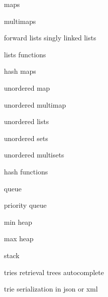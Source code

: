         maps
        
         multimaps
        
         forward lists singly linked lists
        
         lists functions 
         
         hash maps 
        
         unordered map 
         
         unordered multimap 
        
         unordered lists 
        
         unordered sets
        
         unordered multisets
        
         hash functions
        
         queue 
        
         priority queue 

         min heap 
        
         max heap
        
         stack
        
         tries retrieval trees autocomplete 
        
         trie serialization in json or xml 
        
